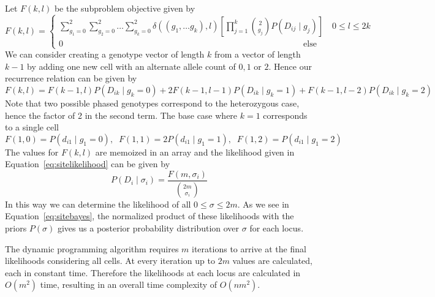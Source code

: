 \documentclass[../../main.tex]{subfiles}
\begin{document}
Let $F(k,l)$ be the subproblem objective given by
\begin{equation}
F(k,l) = \begin{cases} \sum_{g_1=0}^2\sum_{g_2=0}^2\dots\sum_{g_k=0}^2 \delta((g_1,\dots g_k),l)\left[\prod_{j=1}^{k}\binom{2}{g_j}P(D_{ij}\mid g_{j})\right] \quad 0\leq l \leq 2k \\
0 \qquad\qquad\qquad\qquad\qquad\qquad\qquad\qquad\qquad\qquad\qquad\qquad\qquad\qquad \text{else} \end{cases}
\end{equation}
We can consider creating a genotype vector of length $k$ from a vector of length $k-1$ by adding one new cell with an alternate allele count of $0,1$ or $2$.
Hence our recurrence relation can be given by
\begin{equation}
F(k,l) = F(k-1,l)P(D_{ik}\mid g_k = 0) + 2F(k-1,l-1)P(D_{ik}\mid g_k = 1) + F(k-1,l-2)P(D_{ik}\mid g_k = 2)
\end{equation}
Note that two possible phased genotypes correspond to the heterozygous case, hence the factor of 2 in the second term.
The base case where $k=1$ corresponds to a single cell
\begin{equation*}
F(1,0) = P(d_{i1}\mid g_1 = 0),\;\; F(1,1) = 2P(d_{i1}\mid g_1=1),\;\; F(1,2) = P(d_{i1}\mid g_1 = 2)
\end{equation*}
The values for $F(k,l)$ are memoized in an array and the likelihood given in Equation~\ref{eq:sitelikelihood} can be given by
\begin{equation}
P(D_i\mid \sigma_i)=\frac{F(m,\sigma_i)}{\binom{2m}{\sigma_i}}
\end{equation}
In this way we can determine the likelihood of all $0\leq \sigma\leq 2m$.
As we see in Equation~\eqref{eq:sitebayes}, the normalized product of these likelihoods with the priors $P(\sigma)$ gives us a posterior probability distribution over $\sigma$ for each locus.

The dynamic programming algorithm requires $m$ iterations to arrive at the final likelihoods considering all cells.
At every iteration up to $2m$ values are calculated, each in constant time.
Therefore the likelihoods at each locus are calculated in $O(m^2)$ time, resulting in an overall time complexity of $O(nm^2)$.
\end{document}
